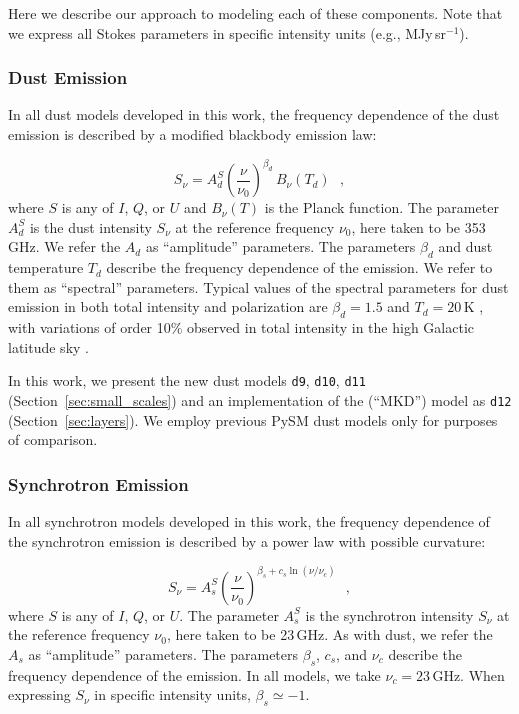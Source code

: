 \documentclass[twocolumn]{aastex631}
\begin{document}
Here we describe our approach to modeling each of these components. Note that we express all Stokes parameters in specific intensity units (e.g., MJy\,sr$^{-1}$).

\subsubsection{Dust Emission} \label{subsubsec:dust_model}
In all dust models developed in this work, the frequency dependence of the dust emission is described by a modified blackbody emission law:

\begin{equation} \label{eq:dust-emission-law}
    S_\nu = A_d^S \left(\frac{\nu}{\nu_0}\right)^{\beta_d} \, B_\nu(T_d)
    ~~~,
\end{equation}
where $S$ is any of $I$, $Q$, or $U$ and $B_\nu\left(T\right)$ is the Planck function. The parameter $A_d^S$ is the dust intensity $S_\nu$ at the reference frequency $\nu_0$, here taken to be 353\,GHz. We refer the $A_d$ as ``amplitude'' parameters. The parameters $\beta_d$ and dust temperature $T_d$ describe the frequency dependence of the emission. We refer to them as ``spectral'' parameters. Typical values of the spectral parameters for dust emission in both total intensity and polarization are $\beta_d = 1.5$ and $T_d = 20$\,K \citep{planck2016-l11A}, with variations of order 10\% observed in total intensity in the high Galactic latitude sky \citep[e.g.,][]{planck2014-a12, planck2016-XLVIII}.

In this work, we present the new dust models \texttt{d9}, \texttt{d10}, \texttt{d11} (Section~\ref{sec:small_scales}) and an implementation of the \citet{Martinez-Solaeche:2018} (``MKD'') model as \texttt{d12} (Section~\ref{sec:layers}). We employ previous PySM dust models only for purposes of comparison.

\subsubsection{Synchrotron Emission} \label{subsubsec:synch_model}
In all synchrotron models developed in this work, the frequency dependence of the synchrotron emission is described by a power law with possible curvature:

\begin{equation} \label{eq:synch-emission-law}
    S_\nu = A_s^S \left(\frac{\nu}{\nu_0}\right)^{\beta_s + c_s \ln\left(\nu/\nu_c\right)}
    ~~~,
\end{equation}
where $S$ is any of $I$, $Q$, or $U$. The parameter $A_s^S$ is the synchrotron intensity $S_\nu$ at the reference frequency $\nu_0$, here taken to be 23\,GHz. As with dust, we refer the $A_s$ as ``amplitude'' parameters. The parameters $\beta_s$, $c_s$, and $\nu_c$ describe the frequency dependence of the emission. In all models, we take $\nu_c = 23$\,GHz. When expressing $S_\nu$ in specific intensity units, $\beta_s \simeq -1$.
\end{document}
